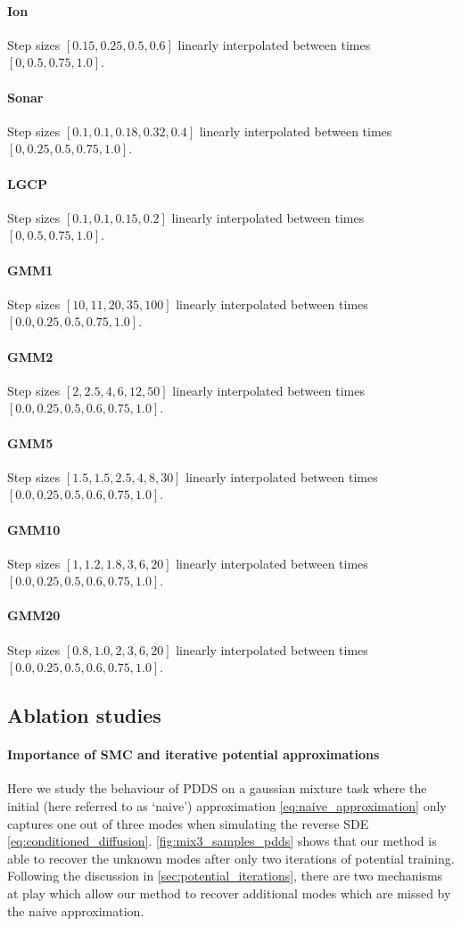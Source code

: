 \documentclass{article}
\theoremstyle{plain}
\theoremstyle{definition}
\theoremstyle{remark}
\begin{document}
\paragraph{Ion} Step sizes $[0.15, 0.25, 0.5, 0.6]$ linearly interpolated between times $[0, 0.5, 0.75, 1.0]$.
\paragraph{Sonar} Step sizes $[0.1, 0.1, 0.18, 0.32, 0.4]$ linearly interpolated between times $[0, 0.25, 0.5, 0.75, 1.0]$.
\paragraph{LGCP} Step sizes $[0.1, 0.1, 0.15, 0.2] $ linearly interpolated between times $[0, 0.5, 0.75, 1.0]$.
\paragraph{GMM1} Step sizes $[10,11,20,35,100]$ linearly interpolated between times $[0.0,0.25,0.5,0.75,1.0]$.
\paragraph{GMM2} Step sizes $[2,2.5,4,6,12,50]$ linearly interpolated between times $[0.0,0.25,0.5,0.6,0.75,1.0]$.
\paragraph{GMM5} Step sizes $[1.5,1.5,2.5,4,8,30]$ linearly interpolated between times $[0.0,0.25,0.5,0.6,0.75,1.0]$.
\paragraph{GMM10} Step sizes $[1,1.2,1.8,3,6,20]$ linearly interpolated between times $[0.0,0.25,0.5,0.6,0.75,1.0]$.
\paragraph{GMM20} Step sizes $[0.8,1.0,2,3,6,20]$ linearly interpolated between times $[0.0,0.25,0.5,0.6,0.75,1.0]$.
\subsection{Ablation studies}
\label{app:additional_ablations}

\paragraph{Importance of SMC and iterative potential approximations}
Here we study the behaviour of PDDS on a gaussian mixture task where the initial (here referred to as `naive') approximation \cref{eq:naive_approximation} only captures one out of three modes when simulating the reverse SDE \cref{eq:conditioned_diffusion}. \cref{fig:mix3_samples_pdds} shows that our method is able to recover the unknown modes after only two iterations of potential training. Following the discussion in \cref{sec:potential_iterations}, there are two mechanisms at play which allow our method to recover additional modes which are missed by the naive approximation.
\end{document}
